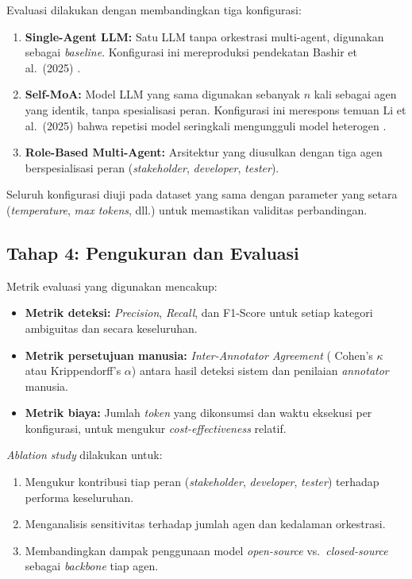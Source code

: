 Evaluasi dilakukan dengan membandingkan tiga konfigurasi:
\begin{enumerate}
	\item \textbf{Single-Agent LLM:} Satu LLM tanpa orkestrasi multi-agent, digunakan sebagai \textit{baseline}. Konfigurasi ini mereproduksi pendekatan Bashir et al.\ (2025) \cite{bashir2025}.
	\item \textbf{Self-MoA:} Model LLM yang sama digunakan sebanyak $n$ kali sebagai agen yang identik, tanpa spesialisasi peran. Konfigurasi ini merespons temuan Li et al.\ (2025) bahwa repetisi model seringkali mengungguli model heterogen \cite{lismoa2025}.
	\item \textbf{Role-Based Multi-Agent:} Arsitektur yang diusulkan dengan tiga agen berspesialisasi peran (\textit{stakeholder}, \textit{developer}, \textit{tester}).
\end{enumerate}

Seluruh konfigurasi diuji pada dataset yang sama dengan parameter yang setara (\textit{temperature}, \textit{max tokens}, dll.) untuk memastikan validitas perbandingan.

\subsection{Tahap 4: Pengukuran dan Evaluasi}

Metrik evaluasi yang digunakan mencakup:
\begin{itemize}
	\item \textbf{Metrik deteksi:} \textit{Precision}, \textit{Recall}, dan F1-Score untuk setiap kategori ambiguitas dan secara keseluruhan.
	\item \textbf{Metrik persetujuan manusia:} \textit{Inter-Annotator Agreement} ( Cohen's $\kappa$ atau Krippendorff's $\alpha$) antara hasil deteksi sistem dan penilaian \textit{annotator} manusia.
	\item \textbf{Metrik biaya:} Jumlah \textit{token} yang dikonsumsi dan waktu eksekusi per konfigurasi, untuk mengukur \textit{cost-effectiveness} relatif.
\end{itemize}

\textit{Ablation study} dilakukan untuk:
\begin{enumerate}
	\item Mengukur kontribusi tiap peran (\textit{stakeholder}, \textit{developer}, \textit{tester}) terhadap performa keseluruhan.
	\item Menganalisis sensitivitas terhadap jumlah agen dan kedalaman orkestrasi.
	\item Membandingkan dampak penggunaan model \textit{open-source} vs.\ \textit{closed-source} sebagai \textit{backbone} tiap agen.
\end{enumerate}

